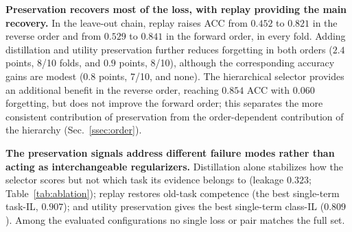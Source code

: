 \documentclass{article}
\begin{document}
\textbf{Preservation recovers most of the loss, with replay providing the main recovery.} In the leave-out chain, replay raises ACC from $0.452$ to $0.821$ in the reverse order and from $0.529$ to $0.841$ in the forward order, in every fold. Adding distillation and utility preservation further reduces forgetting in both orders ($2.4$ points, 8/10 folds, and $0.9$ points, 8/10), although the corresponding accuracy gains are modest ($0.8$ points, 7/10, and none). The hierarchical selector provides an additional benefit in the reverse order, reaching $0.854$ ACC with $0.060$ forgetting, but does not improve the forward order; this separates the more consistent contribution of preservation from the order-dependent contribution of the hierarchy (Sec.~\ref{ssec:order}).

\begin{table}[!htb]
\centering\footnotesize\renewcommand{\arraystretch}{0.92}
\setlength{\tabcolsep}{3.5pt}
\caption{\textbf{Preservation-component ablation with selection-level metrics} (flat, fold 1, 5-seed means). Jaccard and $\Delta U$ are reported for the sequential arms; $\Delta U$ is the per-slide mean change of $U=\log C-\mathrm{CE}$ (logit scale 56.3) on old-task test slides, averaged over old tasks.}
\label{tab:ablation}
\end{table}

\textbf{The preservation signals address different failure modes rather than acting as interchangeable regularizers.} Distillation alone stabilizes how the selector scores but not which task its evidence belongs to (leakage $0.323$; Table~\ref{tab:ablation}); replay restores old-task competence (the best single-term task-IL, $0.907$); and utility preservation gives the best single-term class-IL ($0.809$). Among the evaluated configurations no single loss or pair matches the full set.
\end{document}
